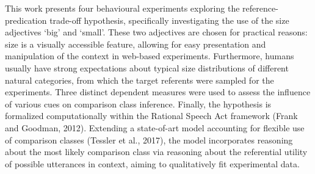 This work presents four behavioural experiments exploring the reference-predication trade-off hypothesis, specifically investigating the use of the size adjectives ‘big’ and ‘small’. These two adjectives are chosen for practical reasons: size is a visually accessible feature, allowing for easy presentation and manipulation of the context in web-based experiments. Furthermore, humans usually have strong expectations about typical size distributions of different natural categories, from which the target referents were sampled for the experiments. Three distinct dependent measures were used to assess the influence of various cues on comparison class inference. 
Finally, the hypothesis is formalized computationally within the Rational Speech Act framework (Frank and Goodman, 2012). Extending a state-of-art model accounting for flexible use of comparison classes (Tessler et al., 2017), the model incorporates reasoning about the most likely comparison class via reasoning about the referential utility of possible utterances in context, aiming to qualitatively fit experimental data. 

